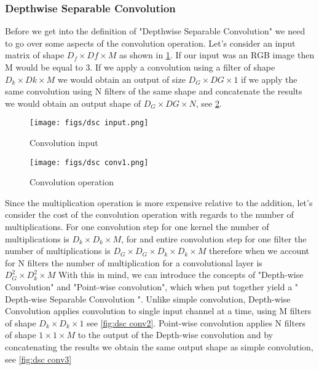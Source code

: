 \subsubsection{Depthwise Separable Convolution}
Before we get into the definition of "Depthwise Separable Convolution" we need to go over some aspects of the convolution operation. Let's consider an input matrix of shape $D_{f} \times D{f} \times M $ as shown in \cref{fig:dsc input}. If our input was an RGB image then M would be equal to 3. If we apply a convolution using a filter of shape $D_{k} \times D{k} \times M $ we would obtain an output of size $D_{G} \times D{G} \times 1 $ if we apply the same convolution using N filters of the same shape and concatenate the results we would obtain an output shape of $D_{G} \times D{G} \times N $, see \cref{fig:dsc conv1}.

\begin{figure}[ht]
	\centering
	\texttt{[image: figs/dsc input.png]}
	\caption{Convolution input }\label{fig:dsc input}
\end{figure}

\begin{figure}[ht]
	\centering
	\texttt{[image: figs/dsc conv1.png]}
	\caption{Convolution operation }\label{fig:dsc conv1}
\end{figure}

Since the multiplication operation is more expensive relative to the addition, let's consider the cost of the convolution operation with regards to the number of multiplications. For one convolution step for one kernel the number of multiplications is $D_{k} \times D_{k} \times M $, for and entire convolution step for one filter the number of multiplications is $D_{G} \times D_{G} \times D_{k} \times D_{k} \times M $ therefore when we account for N filters the number of multiplication for a convolutional layer is $D_{G}^{2} \times D_{k}^{2} \times M $
With this in mind, we can introduce the concepts of "Depth-wise Convolution" and "Point-wise convolution", which when put together yield a " Depth-wise Separable Convolution ". Unlike simple convolution, Depth-wise Convolution applies convolution to single input channel at a time, using M filters of shape  $D_{k} \times D_{k} \times 1 $ see \cref{fig:dsc conv2}. Point-wise convolution applies N filters of shape $1 \times 1 \times M $ to the output of the Depth-wise convolution and by concatenating the results we obtain the same output shape as simple convolution, see \cref{fig:dsc conv3}

